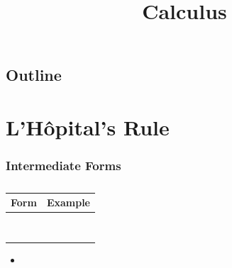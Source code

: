 \documentclass[usenames,dvipsnames,8pt,aspectratio=169]{beamer}
\title{Calculus}
\author{}%
\date{}
\begin{document}
\begin{frame}
  \titlepage
\end{frame}

\subsection*{Outline}
\begin{frame}
  \tableofcontents
\end{frame}


\section{L'H\^opital's Rule}

\begin{frame}
  \frametitle{Intermediate Forms}
  \begin{table}[!htbp]
    \centering
    \caption{}
    \begin{tabular}{cc} \toprule
      Form & Example \\
      \midrule
      \onslide<+->{$\displaystyle\frac{0}{0}$} & \onslide<+->{$\displaystyle\lim_{x\to 0}\frac{\sin x}{x}$ \\}  
      \onslide<+->{$\displaystyle\frac{\infty}{\infty}$} & \onslide<+->{$\displaystyle\lim_{x\to 0}\frac{\ln\frac{1}{x^2}}{\cot x^2}$ \\}  
      \onslide<+->{$\displaystyle 0\cdot\infty$} & \onslide<+->{$\displaystyle\lim_{x\to 0+}x\ln\frac{1}{x}$ \\}  
      \onslide<+->{$\displaystyle \infty - \infty$} & \onslide<+->{$\displaystyle\lim_{x\to\frac{\pi}{2}-}\Big(\tan x - \frac{1}{\pi - 2x}\Big)$ \\}  
      \onslide<+->{$\displaystyle 0^0$} & \onslide<+->{$\displaystyle\lim_{x\to 0+} x^x$ \\}  
      \onslide<+->{$\displaystyle \infty^0$} & \onslide<+->{$\displaystyle\lim_{x\to \frac{\pi}{2}-} (\tan x)^{\cos x}$ \\}  
      \onslide<+->{$\displaystyle 1^\infty$} & \onslide<+->{$\displaystyle\lim_{x\to\infty} \Big(1 + \frac{1}{x}\Big)^x$ \\ \bottomrule}  
    \end{tabular}
  \end{table}
  \begin{itemize}
    \item{}
  \end{itemize}
\end{frame}
\end{document}
